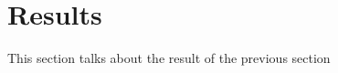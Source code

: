 \documentclass[../main.tex]{subfiles}
\begin{document}
\section{Results}
    This section talks about the result of the previous section
\end{document}

